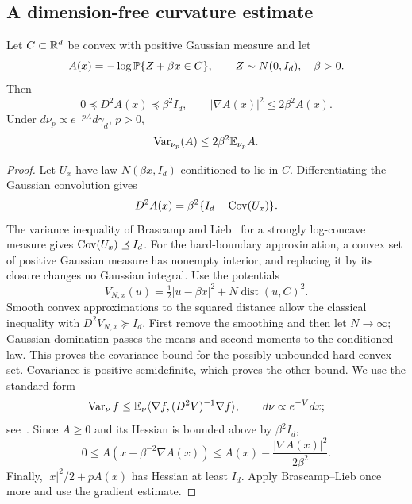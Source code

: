 \subsection{A dimension-free curvature estimate}
\begin{lemma}\label{fp:lem:curvature}
Let $C\subset\mathbb R^d$ be convex with positive Gaussian measure and let
\[
 A(x)=-\log\mathbb P\{Z+\beta x\in C\},\qquad Z\sim N(0,I_d),\quad\beta>0.
\]
Then
\begin{equation}\label{fp:eq:curvature}
 0\preceq D^2A(x)\preceq\beta^2I_d,\qquad
 |\nabla A(x)|^2\le2\beta^2A(x).
\end{equation}
Under $d\nu_p\propto e^{-pA}d\gamma_d$, $p>0$,
\begin{equation}\label{fp:eq:variance}
 \operatorname{Var}_{\nu_p}(A)\le2\beta^2\mathbb E_{\nu_p}A.
\end{equation}
\end{lemma}
\begin{proof}
Let $U_x$ have law $N(\beta x,I_d)$ conditioned to lie in $C$. Differentiating the Gaussian convolution gives
\[
 D^2A(x)=\beta^2\{I_d-\operatorname{Cov}(U_x)\}.
\]
The variance inequality of Brascamp and Lieb~\cite{BrascampLieb1976}
for a strongly log-concave measure gives $\operatorname{Cov}(U_x)\preceq I_d$.
For the hard-boundary approximation, a convex set of positive Gaussian
measure has nonempty interior, and replacing it by its closure changes
no Gaussian integral. Use the potentials
\[
 V_{N,x}(u)=\tfrac12|u-\beta x|^2+N\operatorname{dist}(u,C)^2.
\]
Smooth convex approximations to the squared distance allow the classical inequality with $D^2V_{N,x}\succeq I_d$. First remove the smoothing and then let $N\to\infty$; Gaussian domination passes the means and second moments to the conditioned law. This proves the covariance bound for the possibly unbounded hard convex set. Covariance is positive semidefinite, which proves the other bound. We use the standard form
\[
 \operatorname{Var}_\nu f\le\mathbb E_\nu\langle\nabla f,(D^2V)^{-1}\nabla f\rangle,
 \qquad d\nu\propto e^{-V}dx;
\]
see~\cite[equation~(1.3)]{CarlenCorderoLieb2013}. Since $A\ge0$ and its Hessian is bounded above by $\beta^2I_d$,
\[
 0\le A(x-\beta^{-2}\nabla A(x))
 \le A(x)-\frac{|\nabla A(x)|^2}{2\beta^2}.
\]
Finally, $|x|^2/2+pA(x)$ has Hessian at least $I_d$. Apply Brascamp--Lieb once more and use the gradient estimate.
\end{proof}

